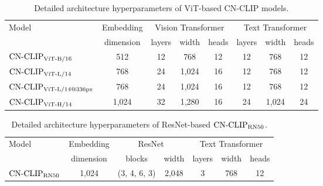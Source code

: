 \begin{table}[t]
\center
\small
\begin{tabular}{@{\extracolsep{\fill}}lccccccc}
\toprule
  \multirow{2}{*}{Model}
  & Embedding
  & \multicolumn{3}{c}{Vision Transformer}
  & \multicolumn{3}{c}{Text Transformer}
  \\
  & dimension
  & layers
  & width
  & heads
  & layers
  & width
  & heads
  \\
\midrule
    $\text{CN-CLIP}\rm_{ViT\text{-}B/16}$
    & 512
    & 12
    & 768
    & 12
    & 12
    & 768
    & 12
    \\
    $\text{CN-CLIP}\rm_{ViT\text{-}L/14}$
    & 768
    & 24
    & 1,024
    & 16
    & 12
    & 768
    & 12
    \\
    $\text{CN-CLIP}\rm_{ViT\text{-}L/14@336px}$
    & 768
    & 24
    & 1,024
    & 16
    & 12
    & 768
    & 12
    \\
    $\text{CN-CLIP}\rm_{ViT\text{-}H/14}$
    & 1,024
    & 32
    & 1,280
    & 16
    & 24
    & 1,024
    & 24
    \\
\bottomrule
\end{tabular}
\caption{Detailed architecture hyperparameters of ViT-based CN-CLIP models.}
\label{tb:detailed_architecture_vit}
\end{table}

\begin{table}[t]
\center
\small
\begin{tabular}{@{\extracolsep{\fill}}lcccccc}
\toprule
  \multirow{2}{*}{Model}
  & Embedding
  & \multicolumn{2}{c}{ResNet}
  & \multicolumn{3}{c}{Text Transformer}
  \\
  & dimension
  & blocks
  & width
  & layers
  & width
  & heads
  \\
\midrule
    $\text{CN-CLIP}\rm_{RN50}$
    & 1,024
    & (3, 4, 6, 3)
    & 2,048
    & 3
    & 768
    & 12
    \\
\bottomrule
\end{tabular}
\caption{Detailed architecture hyperparameters of ResNet-based $\text{CN-CLIP}\rm_{RN50}$.}
\label{tb:detailed_architecture_rn}
\end{table}